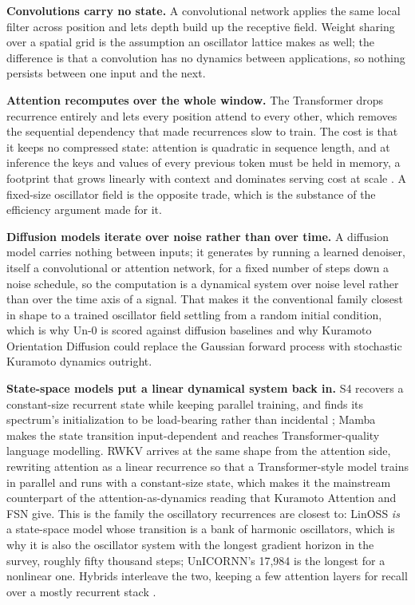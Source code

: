 \documentclass[10pt]{article}
\begin{document}
\textbf{Convolutions carry no state.} A convolutional network
\citep{lecun1998} applies the same local filter across position and lets
depth build up the receptive field. Weight sharing over a spatial grid
is the assumption an oscillator lattice makes as well; the difference is
that a convolution has no dynamics between applications, so nothing
persists between one input and the next.

\textbf{Attention recomputes over the whole window.} The Transformer
\citep{vaswani2017} drops recurrence entirely and lets every position
attend to every other, which removes the sequential dependency that made
recurrences slow to train. The cost is that it keeps no compressed
state: attention is quadratic in sequence length, and at inference the
keys and values of every previous token must be held in memory, a
footprint that grows linearly with context and dominates serving cost at
scale \citep{kwon2023}. A fixed-size oscillator field is the opposite
trade, which is the substance of the efficiency argument made for it.

\textbf{Diffusion models iterate over noise rather than over time.} A
diffusion model \citep{sohl-dickstein2015, ho2020} carries nothing
between inputs; it generates by running a learned denoiser, itself a
convolutional or attention network, for a fixed number of steps down a
noise schedule, so the computation is a dynamical system over noise
level rather than over the time axis of a signal. That makes it the
conventional family closest in shape to a trained oscillator field
settling from a random initial condition, which is why Un-0 is scored
against diffusion baselines and why Kuramoto Orientation Diffusion could
replace the Gaussian forward process with stochastic Kuramoto dynamics
outright.

\textbf{State-space models put a linear dynamical system back in.} S4
\citep{s4} recovers a constant-size recurrent state while keeping
parallel training, and finds its spectrum's initialization to be
load-bearing rather than incidental \citep{how-train-your-hippo}; Mamba
\citep{mamba} makes the state transition input-dependent and reaches
Transformer-quality language modelling. RWKV \citep{peng2023} arrives at
the same shape from the attention side, rewriting attention as a linear
recurrence so that a Transformer-style model trains in parallel and runs
with a constant-size state, which makes it the mainstream counterpart of
the attention-as-dynamics reading that Kuramoto Attention and FSN give.
This is the family the oscillatory recurrences are closest to: LinOSS
\emph{is} a state-space model whose transition is a bank of harmonic
oscillators, which is why it is also the oscillator system with the
longest gradient horizon in the survey, roughly fifty thousand steps;
UnICORNN's 17,984 is the longest for a nonlinear one. Hybrids interleave
the two, keeping a few attention layers for recall over a mostly
recurrent stack \citep{lieber2024}.
\end{document}
